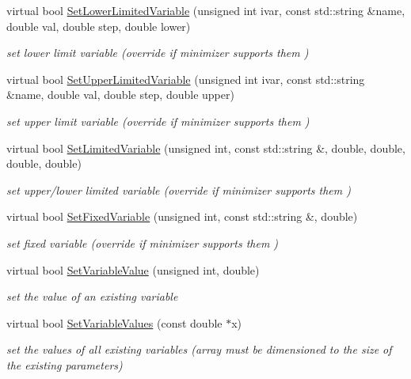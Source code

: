 \begin{DoxyCompactItemize}
virtual bool \mbox{\hyperlink{classROOT_1_1Math_1_1Minimizer_a0fed20bdc58d05ce2b92d2bf47594dfb}{Set\+Lower\+Limited\+Variable}} (unsigned int ivar, const std\+::string \&name, double val, double step, double lower)
\begin{DoxyCompactList}\small\item\em set lower limit variable (override if minimizer supports them ) \end{DoxyCompactList}\item 
virtual bool \mbox{\hyperlink{classROOT_1_1Math_1_1Minimizer_a804843fbaea82809b3c54232d0c1fe86}{Set\+Upper\+Limited\+Variable}} (unsigned int ivar, const std\+::string \&name, double val, double step, double upper)
\begin{DoxyCompactList}\small\item\em set upper limit variable (override if minimizer supports them ) \end{DoxyCompactList}\item 
virtual bool \mbox{\hyperlink{classROOT_1_1Math_1_1Minimizer_a4303530cbb62ceb7cf9c9ebcbde530c2}{Set\+Limited\+Variable}} (unsigned int, const std\+::string \&, double, double, double, double)
\begin{DoxyCompactList}\small\item\em set upper/lower limited variable (override if minimizer supports them ) \end{DoxyCompactList}\item 
virtual bool \mbox{\hyperlink{classROOT_1_1Math_1_1Minimizer_a063e9d83c8a61afc8798ebb1d74b6f2b}{Set\+Fixed\+Variable}} (unsigned int, const std\+::string \&, double)
\begin{DoxyCompactList}\small\item\em set fixed variable (override if minimizer supports them ) \end{DoxyCompactList}\item 
virtual bool \mbox{\hyperlink{classROOT_1_1Math_1_1Minimizer_a47e9a16c7a0b4ecfe769ee4be048d5c3}{Set\+Variable\+Value}} (unsigned int, double)
\begin{DoxyCompactList}\small\item\em set the value of an existing variable \end{DoxyCompactList}\item 
virtual bool \mbox{\hyperlink{classROOT_1_1Math_1_1Minimizer_ac8368efbd59da8e0b8bc0a0966309609}{Set\+Variable\+Values}} (const double $\ast$x)
\begin{DoxyCompactList}\small\item\em set the values of all existing variables (array must be dimensioned to the size of the existing parameters) \end{DoxyCompactList}\item 

\end{DoxyCompactItemize}
